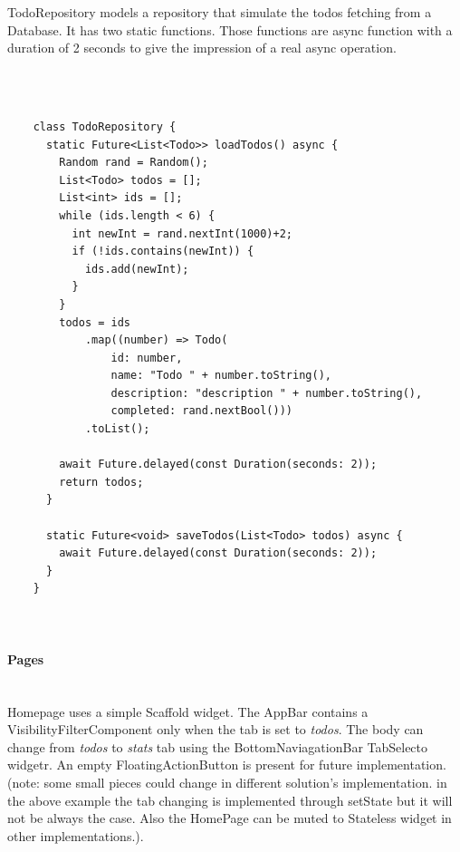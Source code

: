 	\mbox{}
	
	
	TodoRepository models a repository that simulate the todos fetching from a Database. It has two static functions. Those functions are async function with a duration of 2 seconds to give the impression of a real async operation.
	
	\mbox{}\\
	
	 \mbox{}
	\begin{verbatim}
	
	class TodoRepository {
	  static Future<List<Todo>> loadTodos() async {
	    Random rand = Random();
	    List<Todo> todos = [];
	    List<int> ids = [];
	    while (ids.length < 6) {
	      int newInt = rand.nextInt(1000)+2;
	      if (!ids.contains(newInt)) {
	        ids.add(newInt);
	      }
	    }
	    todos = ids
	        .map((number) => Todo(
	            id: number,
	            name: "Todo " + number.toString(),
	            description: "description " + number.toString(),
	            completed: rand.nextBool()))
	        .toList();
	
	    await Future.delayed(const Duration(seconds: 2));
	    return todos;
	  }
	
	  static Future<void> saveTodos(List<Todo> todos) async {
	    await Future.delayed(const Duration(seconds: 2));
	  }
	}
	
	
	\end{verbatim}
	
	\mbox{}
	
	
	\paragraph{Pages} \mbox{} \\
	\label{par:pages_todo_app}
	Homepage uses a simple Scaffold widget. The AppBar contains a VisibilityFilterComponent only when the tab is set to \textit{todos}. The body can change from \textit{todos} to \textit{stats} tab using the BottomNaviagationBar TabSelecto widgetr. An empty FloatingActionButton is present for future implementation.
	(note: some small pieces could change in different solution’s implementation. in the above example the tab changing is implemented through setState but it will not be always the case. Also the HomePage can be muted to Stateless widget in other implementations.).
	
	\mbox{}\\
	
